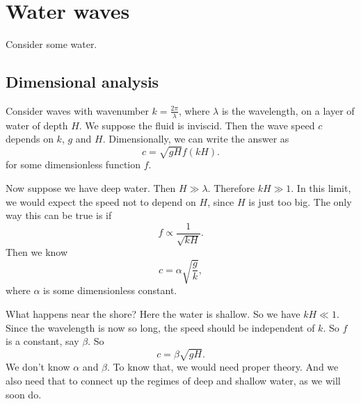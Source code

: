 \documentclass[a4paper]{article}
\begin{document}
\section{Water waves}
Consider some water.
\begin{center}
\end{center}
\subsection{Dimensional analysis}
Consider waves with wavenumber $k = \frac{2\pi}{\lambda}$, where $\lambda$ is the wavelength, on a layer of water of depth $H$. We suppose the fluid is inviscid. Then the wave speed $c$ depends on $k$, $g$ and $H$. Dimensionally, we can write the answer as
\[
  c = \sqrt{gH} f(kH).
\]
for some dimensionless function $f$.

Now suppose we have deep water. Then $H \gg \lambda$. Therefore $kH \gg 1$. In this limit, we would expect the speed not to depend on $H$, since $H$ is just too big. The only way this can be true is if
\[
  f \propto \frac{1}{\sqrt{kH}}.
\]
Then we know
\[
  c = \alpha \sqrt{\frac{g}{k}},
\]
where $\alpha$ is some dimensionless constant.

What happens near the shore? Here the water is shallow. So we have $kH \ll 1$. Since the wavelength is now so long, the speed should be independent of $k$. So $f$ is a constant, say $\beta$. So
\[
  c = \beta\sqrt{gH}.
\]
We don't know $\alpha$ and $\beta$. To know that, we would need proper theory. And we also need that to connect up the regimes of deep and shallow water, as we will soon do.
\end{document}
